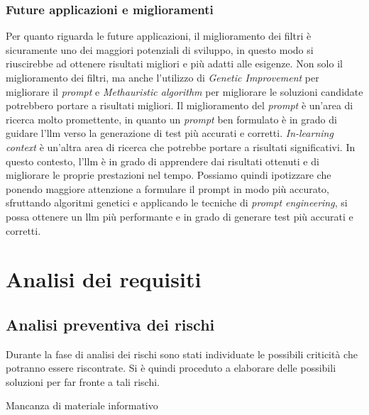     \subsubsection{Future applicazioni e miglioramenti} 
        Per quanto riguarda le future applicazioni,
        il miglioramento dei filtri è sicuramente uno dei maggiori potenziali di sviluppo, in questo modo si riuscirebbe ad ottenere risultati migliori e più adatti alle esigenze.
        Non solo il miglioramento dei filtri, ma anche l'utilizzo di \textit{Genetic Improvement} per migliorare il \textit{prompt} e \textit{Methauristic algorithm} per migliorare le soluzioni candidate potrebbero portare a risultati migliori.
        Il miglioramento del \textit{prompt} è un'area di ricerca molto promettente, in quanto un \textit{prompt} ben formulato è in grado di guidare l'\gls{llm} verso la generazione di test più accurati e corretti.
        \textit{In-learning context} è un'altra area di ricerca che potrebbe portare a risultati significativi. In questo contesto, l'\gls{llm} è in grado di apprendere dai risultati ottenuti e di migliorare le proprie prestazioni nel tempo.
        Possiamo quindi ipotizzare che ponendo maggiore attenzione a formulare il prompt in modo più accurato, sfruttando algoritmi genetici e applicando le tecniche di \textit{prompt engineering}, si possa ottenere un \gls{llm} più performante e in grado di generare test più accurati e corretti.
\section{Analisi dei requisiti}
    \subsection{Analisi preventiva dei rischi}
    Durante la fase di analisi dei rischi sono stati individuate le possibili criticità che potranno essere riscontrate.
    Si è quindi proceduto a elaborare delle possibili soluzioni per far fronte a tali rischi.

    \begin{risk}{Mancanza di materiale informativo}
        \label{risk:data-absence} 
    \end{risk}

